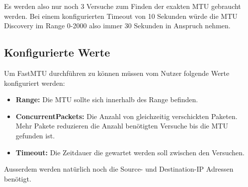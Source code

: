Es werden also nur noch 3 Versuche zum Finden der exakten \ac{MTU} gebraucht werden. Bei einem konfigurierten Timeout von 10 Sekunden würde die \ac{MTU} Discovery im Range 0-2000 also immer 30 Sekunden in Anspruch nehmen.

\subsection{Konfigurierte Werte}
Um FastMTU durchführen zu können müssen vom Nutzer folgende Werte konfiguriert werden:

\begin{itemize}
  \item \textbf{Range:} Die \ac{MTU} sollte sich innerhalb des Range befinden.
  \item \textbf{ConcurrentPackets:} Die Anzahl von gleichzeitig verschickten Paketen. Mehr Pakete reduzieren die Anzahl benötigten Versuche bis die \ac{MTU} gefunden ist.
  \item \textbf{Timeout:} Die Zeitdauer die gewartet werden soll zwischen den Versuchen.
\end{itemize}

Ausserdem werden natürlich noch die Source- und Destination-IP Adressen benötigt.

